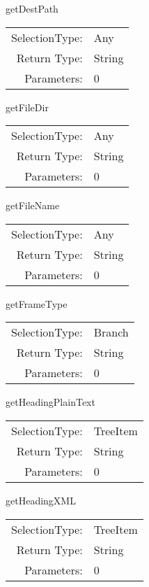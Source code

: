 \item getDestPath\\
\begin{tabular}{rl}
  SelectionType: & Any\\
    Return Type: & String\\
     Parameters: & 0\\
\end{tabular}

\item getFileDir\\
\begin{tabular}{rl}
  SelectionType: & Any\\
    Return Type: & String\\
     Parameters: & 0\\
\end{tabular}

\item getFileName\\
\begin{tabular}{rl}
  SelectionType: & Any\\
    Return Type: & String\\
     Parameters: & 0\\
\end{tabular}

\item getFrameType\\
\begin{tabular}{rl}
  SelectionType: & Branch\\
    Return Type: & String\\
     Parameters: & 0\\
\end{tabular}

\item getHeadingPlainText\\
\begin{tabular}{rl}
  SelectionType: & TreeItem\\
    Return Type: & String\\
     Parameters: & 0\\
\end{tabular}

\item getHeadingXML\\
\begin{tabular}{rl}
  SelectionType: & TreeItem\\
    Return Type: & String\\
     Parameters: & 0\\
\end{tabular}

